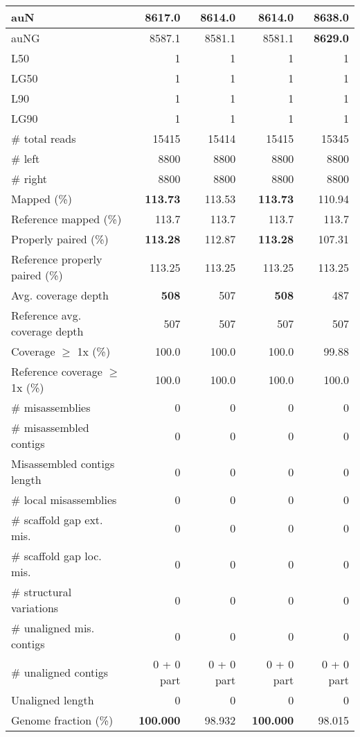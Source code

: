 \documentclass[12pt,a4paper]{article}
\begin{document}
\begin{table}[ht]
\begin{center}
\begin{tabular}{|l*{4}{|r}|}
auN & 8617.0 & 8614.0 & 8614.0 & {\bf 8638.0} \\ \hline
auNG & 8587.1 & 8581.1 & 8581.1 & {\bf 8629.0} \\ \hline
L50 & 1 & 1 & 1 & 1 \\ \hline
LG50 & 1 & 1 & 1 & 1 \\ \hline
L90 & 1 & 1 & 1 & 1 \\ \hline
LG90 & 1 & 1 & 1 & 1 \\ \hline
\# total reads & 15415 & 15414 & 15415 & 15345 \\ \hline
\# left & 8800 & 8800 & 8800 & 8800 \\ \hline
\# right & 8800 & 8800 & 8800 & 8800 \\ \hline
Mapped (\%) & {\bf 113.73} & 113.53 & {\bf 113.73} & 110.94 \\ \hline
Reference mapped (\%) & 113.7 & 113.7 & 113.7 & 113.7 \\ \hline
Properly paired (\%) & {\bf 113.28} & 112.87 & {\bf 113.28} & 107.31 \\ \hline
Reference properly paired (\%) & 113.25 & 113.25 & 113.25 & 113.25 \\ \hline
Avg. coverage depth & {\bf 508} & 507 & {\bf 508} & 487 \\ \hline
Reference avg. coverage depth & 507 & 507 & 507 & 507 \\ \hline
Coverage $\geq$ 1x (\%) & 100.0 & 100.0 & 100.0 & 99.88 \\ \hline
Reference coverage $\geq$ 1x (\%) & 100.0 & 100.0 & 100.0 & 100.0 \\ \hline
\# misassemblies & 0 & 0 & 0 & 0 \\ \hline
\# misassembled contigs & 0 & 0 & 0 & 0 \\ \hline
Misassembled contigs length & 0 & 0 & 0 & 0 \\ \hline
\# local misassemblies & 0 & 0 & 0 & 0 \\ \hline
\# scaffold gap ext. mis. & 0 & 0 & 0 & 0 \\ \hline
\# scaffold gap loc. mis. & 0 & 0 & 0 & 0 \\ \hline
\# structural variations & 0 & 0 & 0 & 0 \\ \hline
\# unaligned mis. contigs & 0 & 0 & 0 & 0 \\ \hline
\# unaligned contigs & 0 + 0 part & 0 + 0 part & 0 + 0 part & 0 + 0 part \\ \hline
Unaligned length & 0 & 0 & 0 & 0 \\ \hline
Genome fraction (\%) & {\bf 100.000} & 98.932 & {\bf 100.000} & 98.015 \\ \hline

\end{tabular}
\end{center}
\end{table}
\end{document}

